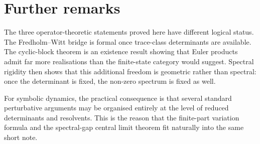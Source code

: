 \section{Further remarks}\label{sec:conclusion}

The three operator-theoretic statements proved here have different
logical status. The Fredholm--Witt bridge is formal once trace-class
determinants are available. The cyclic-block theorem is an existence
result showing that Euler products admit far more realisations than the
finite-state category would suggest. Spectral rigidity then shows that
this additional freedom is geometric rather than spectral: once the
determinant is fixed, the non-zero spectrum is fixed as well.

For symbolic dynamics, the practical consequence is that several
standard perturbative arguments may be organised entirely at the level
of reduced determinants and resolvents. This is the reason that the
finite-part variation formula and the spectral-gap central limit theorem
fit naturally into the same short note.

